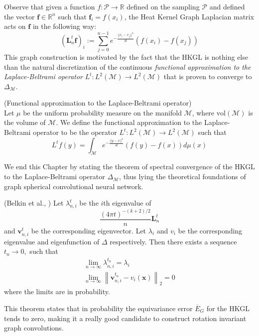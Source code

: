 Observe that given a function $f: \mathcal P \rightarrow \mathbb R$ defined on the sampling $ \mathcal P$ and defined the vector $\mathbf f\in\mathbb R^n$ such that $\mathbf f_i = f(x_i)$, the Heat Kernel Graph Laplacian matrix acts on $\mathbf f$ in the following way:
\begin{equation}\label{eq:HKGL}
(\mathbf L_n^t \mathbf f)_i:=  \sum_{j=0}^{n-1} e^{-\frac{||x_i-x_j||^2}{4t}}\left(f(x_i)-f(x_j)\right)
\end{equation}
This graph construction is motivated by the fact that the HKGL is nothing else than the natural discretization of the continuous \textit{functional approximation to the Laplace-Beltrami operator} $L^t:  L^{2}(\mathcal{M}) \rightarrow L^{2}(\mathcal{M})$ that is proven to converge to $\Delta_\mathcal M$.
\vspace{0.5cm}
\begin{definition}{}(\cite[Belkin et al.]{Belkin:2005:TTF:2138147.2138189}Functional approximation to the Laplace-Beltrami operator)\\ \label{eq: my L^t} Let $\mu$ be the uniform probability measure on the manifold $\mathcal M$, where $\text{vol}(\mathcal M)$ is the volume of $\mathcal M$. We define the functional approximation to the Laplace-Beltrami operator to be the operator $L^t: L^{2}(\mathcal{M}) \rightarrow L^{2}(\mathcal{M})$ such that
	\label{def:Functional approximation to the Laplace-Beltrami operator}
	$$ L^tf(y) = \int_{\mathcal M}e^{-\frac{||y-x||^2}{4t}}\left(f(y)-f(x)\right)d\mu(x)$$
\end{definition}
\vspace{0.3cm}
We end this Chapter by stating the theorem of spectral convergence of the HKGL to the Laplace-Beltrami operator $\Delta_\mathcal M$, thus lying the theoretical foundations of graph spherical convolutional neural network.
\vspace{0.5cm}
\begin{snugshade*}
	\begin{theorem}(Belkin et al., \cite{NIPS2006_2989})\label{theo:spectral convergence}
		Let \(\lambda_{n, i}^{t}\) be the $i$th eigenvalue of 
		$$
		\frac{(4\pi t)^{-(k+2)/2}}{n}\mathbf L^t_n
		$$
		and \(\mathbf v_{n, i}^{t}\) be the corresponding eigenvector. Let \(\lambda_{i}\) and \(v_{i}\) be the corresponding eigenvalue and eigenfunction of \(\Delta\) respectively. Then there exists a sequence \(t_{n} \rightarrow 0,\) such that
		\begin{equation}
		\begin{array}{c}{\lim _{n \rightarrow \infty} \lambda_{n, i}^{t_{n}}=\lambda_{i}} \\ 
		{\lim _{n \rightarrow \infty}\left\|\mathbf v_{n, i}^{t_{n}}-v_{i}(\mathbf x)\right\|_{2}=0}\end{array}
		\end{equation}
		where the limits are in probability.
	\end{theorem}
\end{snugshade*}
This theorem states that in probability the equivariance error $\overline E_G$ for the HKGL tends to zero, making it a really good candidate to construct rotation invariant graph convolutions.



